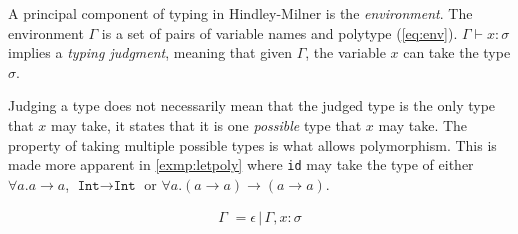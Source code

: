 \documentclass[11pt,oneside,a4paper]{report}
\begin{document}
A principal component of typing in Hindley-Milner is the \textit{environment}.
The environment $\Gamma$ is a set of pairs of variable names and polytype (\autoref{eq:env}).
$\Gamma \vdash x: \sigma$ implies a \textit{typing judgment}, meaning that given $\Gamma$, the variable $x$ can take the type $\sigma$.
\begin{remark}
    \label{remark:judgpoly}
    Judging a type does not necessarily mean that the judged type is the only type that $x$ may take, it states that it is one \textit{possible} type that $x$ may take.
    The property of taking multiple possible types is what allows polymorphism.
    This is made more apparent in \autoref{exmp:letpoly} where \texttt{id} may take the type of either $\forall a . a \rightarrow a$, $\texttt{Int} \rightarrow \texttt{Int}$ or $\forall a . (a \rightarrow a) \rightarrow (a \rightarrow a)$.
\end{remark}
\begin{align}
	\Gamma \,\, = \epsilon \,|\, \Gamma, x : \sigma
	\label{eq:env}
\end{align}
\end{document}
